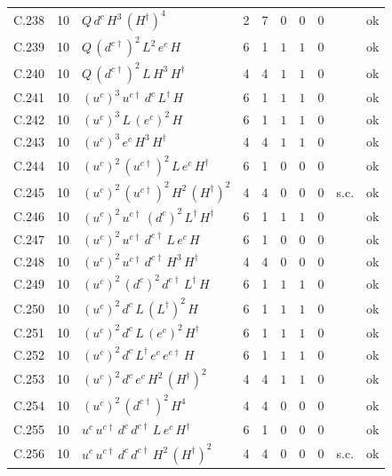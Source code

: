 {\begin{longtable}{@{}ll>{\raggedright\arraybackslash}p{6.4cm}rrllllr@{}}
C.238 & 10 & $Q\,d^c\,H^{3}\,(H^\dagger)^{4}$ & 2 & 7 & $0$ & $0$ & $0$ &  & ok \\
C.239 & 10 & $Q\,(d^{c\dagger})^{2}\,L^{2}\,e^c\,H$ & 6 & 1 & $1$ & $1$ & $0$ &  & ok \\
C.240 & 10 & $Q\,(d^{c\dagger})^{2}\,L\,H^{3}\,H^\dagger$ & 4 & 4 & $1$ & $1$ & $0$ &  & ok \\
C.241 & 10 & $(u^c)^{3}\,u^{c\dagger}\,d^c\,L^\dagger\,H$ & 6 & 1 & $1$ & $1$ & $0$ &  & ok \\
C.242 & 10 & $(u^c)^{3}\,L\,(e^c)^{2}\,H$ & 6 & 1 & $1$ & $1$ & $0$ &  & ok \\
C.243 & 10 & $(u^c)^{3}\,e^c\,H^{3}\,H^\dagger$ & 4 & 4 & $1$ & $1$ & $0$ &  & ok \\
C.244 & 10 & $(u^c)^{2}\,(u^{c\dagger})^{2}\,L\,e^c\,H^\dagger$ & 6 & 1 & $0$ & $0$ & $0$ &  & ok \\
C.245 & 10 & $(u^c)^{2}\,(u^{c\dagger})^{2}\,H^{2}\,(H^\dagger)^{2}$ & 4 & 4 & $0$ & $0$ & $0$ & s.c. & ok \\
C.246 & 10 & $(u^c)^{2}\,u^{c\dagger}\,(d^c)^{2}\,L^\dagger\,H^\dagger$ & 6 & 1 & $1$ & $1$ & $0$ &  & ok \\
C.247 & 10 & $(u^c)^{2}\,u^{c\dagger}\,d^{c\dagger}\,L\,e^c\,H$ & 6 & 1 & $0$ & $0$ & $0$ &  & ok \\
C.248 & 10 & $(u^c)^{2}\,u^{c\dagger}\,d^{c\dagger}\,H^{3}\,H^\dagger$ & 4 & 4 & $0$ & $0$ & $0$ &  & ok \\
C.249 & 10 & $(u^c)^{2}\,(d^c)^{2}\,d^{c\dagger}\,L^\dagger\,H$ & 6 & 1 & $1$ & $1$ & $0$ &  & ok \\
C.250 & 10 & $(u^c)^{2}\,d^c\,L\,(L^\dagger)^{2}\,H$ & 6 & 1 & $1$ & $1$ & $0$ &  & ok \\
C.251 & 10 & $(u^c)^{2}\,d^c\,L\,(e^c)^{2}\,H^\dagger$ & 6 & 1 & $1$ & $1$ & $0$ &  & ok \\
C.252 & 10 & $(u^c)^{2}\,d^c\,L^\dagger\,e^c\,e^{c\dagger}\,H$ & 6 & 1 & $1$ & $1$ & $0$ &  & ok \\
C.253 & 10 & $(u^c)^{2}\,d^c\,e^c\,H^{2}\,(H^\dagger)^{2}$ & 4 & 4 & $1$ & $1$ & $0$ &  & ok \\
C.254 & 10 & $(u^c)^{2}\,(d^{c\dagger})^{2}\,H^{4}$ & 4 & 4 & $0$ & $0$ & $0$ &  & ok \\
C.255 & 10 & $u^c\,u^{c\dagger}\,d^c\,d^{c\dagger}\,L\,e^c\,H^\dagger$ & 6 & 1 & $0$ & $0$ & $0$ &  & ok \\
C.256 & 10 & $u^c\,u^{c\dagger}\,d^c\,d^{c\dagger}\,H^{2}\,(H^\dagger)^{2}$ & 4 & 4 & $0$ & $0$ & $0$ & s.c. & ok \\

\end{longtable}}

